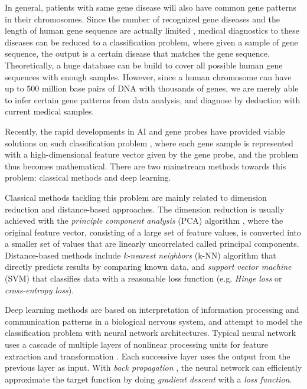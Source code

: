 \documentclass[10pt,twocolumn,letterpaper]{article}
\begin{document}
	In general, patients with same gene disease will also have common gene patterns in their chromosomes. Since the number of recognized gene diseases and the length of human gene sequence are actually limited \cite{geneLimit}, medical diagnostics to these diseases can be reduced to a classification problem, where given a sample of gene sequence, the output is a certain disease that matches the gene sequence. Theoretically, a huge database can be build to cover all possible human gene sequences with enough samples. However, since a human chromosome can have up to 500 million base pairs of DNA with thousands of genes, we are merely able to infer certain gene patterns from data analysis, and diagnose by deduction with current medical samples.
	
	Recently, the rapid developments in AI and gene probes have provided viable solutions on such classification problem \cite{MLinGene, geneProbe}, where each gene sample is represented with a high-dimensional feature vector given by the gene probe, and the problem thus becomes mathematical. There are two mainstream methods towards this problem: classical methods and deep learning.
	
	Classical methods tackling this problem are mainly related to dimension reduction and distance-based approaches. The dimension reduction is usually achieved with the \emph{principle component analysis} (PCA) algorithm \cite{pca}, where the original feature vector, consisting of a large set of feature values, is converted into a smaller set of values that are linearly uncorrelated called principal components. Distance-based methods include \emph{k-nearest neighbors} (k-NN) algorithm \cite{knn} that directly predicts results by comparing known data, and \emph{support vector machine} (SVM) \cite{svm} that classifies data with a reasonable loss function (e.g. \emph{Hinge loss} or \emph{cross-entropy loss}).
	
	Deep learning methods are based on interpretation of information processing and communication patterns in a biological nervous system, and attempt to model the classification problem with neural network architectures. Typical neural network uses a cascade of multiple layers of nonlinear processing units for feature extraction and transformation \cite{deepLearning1}. Each successive layer uses the output from the previous layer as input. With \emph{back propagation} \cite{BP}, the neural network can efficiently approximate the target function by doing \emph{gradient descent} with a \emph{loss function}.
\end{document}
